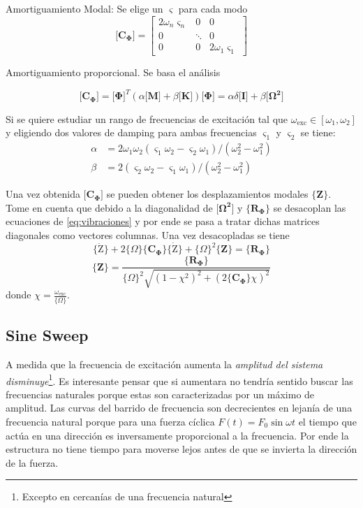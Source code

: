 \documentclass[11pt, a4paper,titlepage]{article}
\newcommand{\Phib}{\boldsymbol{\Phi}}
\newcommand{\Omegab}{\boldsymbol{\Omega}}
\newcommand{\COmega}{\boldsymbol{\{ } \Omega \boldsymbol{\} }}
\newcommand{\Mme}[1]{\boldsymbol{[}\mathbf{#1} \boldsymbol{]}}
\newcommand{\Cme}[1]{\boldsymbol{\{ }\mathbf{#1} \boldsymbol{\}} }
\newcommand{\modal}{{_{\Phib}}}
\newcommand{\dampfact}{\varsigma}
\begin{document}
Amortiguamiento Modal: Se elige un $\dampfact$ para cada modo
\begin{equation}
\Mme{C\modal}=\left[ \begin{array}{ccc}{2 \omega_{n} \dampfact_{n}} & {0} & {0} \\ {0} & {\ddots} & {0} \\ {0} & {0} & {2 \omega_{1} \dampfact_{1}}\end{array}\right]
\end{equation}

Amortiguamiento proporcional. Se basa el análisis 

\begin{equation}
	\Mme{C\modal} = \Mme{\Phib}^T ( \alpha \Mme{M}+\beta \Mme{K})\Mme{\Phib} = \alpha \delta \Mme{I} +\beta \Mme{\Omegab^2}
\end{equation}

Si se quiere estudiar un rango de frecuencias de excitación tal que $\omega_{\mathrm{exc}}\in [\omega_1, \omega_2]$ y eligiendo dos valores de damping para ambas frecuencias $\dampfact_1$ y $\dampfact_2$ se tiene:
\begin{align*}
\alpha &= 2\omega_1 \omega_2 (\dampfact_1 \omega_2 -\dampfact_2 \omega_1)/(\omega_2^2 - \omega_1^2) \\ \beta &= 2(\dampfact_2\omega_2 -\dampfact_1 \omega_1)/(\omega_2^2 - \omega_1^2)
\end{align*}

Una vez obtenida $\Mme{C\modal}$ se pueden obtener los desplazamientos modales $\Cme{Z}$. Tome en cuenta que debido a la diagonalidad de $\Mme{\Omegab^2}$ y $\Cme{R\modal }$ se desacoplan las ecuaciones de \ref{eq:vibraciones} y por ende se pasa a tratar dichas matrices diagonales como vectores columnas. Una vez desacopladas se tiene
 \[\Cme{\boldsymbol{\ddot{\mathrm{Z}}}}+2\COmega \Cme{C\modal} \Cme{\boldsymbol{\dot{\mathrm{Z}}}} + \COmega^2 \Cme{Z} = \Cme{R\modal} \]
\[
\Cme{Z} = \frac{\Cme{R\modal }}{{\COmega}^2 \sqrt{(1-\chi^2)^2 + (2 \Cme{C\modal} \chi)^2}}
\]
donde $\chi = \frac{\omega_{\mathrm{exc}}}{\COmega}$. 



\subsection{Sine Sweep}
A medida que la frecuencia de excitación aumenta la \textit{amplitud del sistema disminuye}\footnote{Excepto en cercanías de una frecuencia natural}. Es interesante pensar que si aumentara no tendría sentido buscar las frecuencias naturales porque estas son caracterizadas por un máximo de amplitud. Las curvas del barrido de frecuencia son decrecientes en lejanía de una frecuencia natural porque para una fuerza cíclica $F(t)=F_0\sin \omega t$ el tiempo que actúa en una dirección es inversamente proporcional a la frecuencia. Por ende la estructura no tiene tiempo para moverse lejos antes de que se invierta la dirección de la fuerza.
\end{document}

